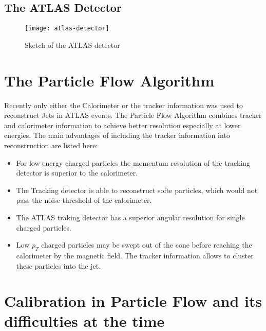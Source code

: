 \subsection{The ATLAS Detector}

\begin{figure}[htbp]
  \centering
  \texttt{[image: atlas-detector]}
  \caption[Sketch of the LHC ring, the position of the experiments and
  the surrounding countryside.]{Sketch of the ATLAS detector}
  \label{fig:atlas}
\end{figure}




\section{The Particle Flow Algorithm}

Recently only either the Calorimeter or the tracker information was used to reconstruct Jets in ATLAS events. The Particle Flow Algorithm combines tracker and calorimeter information to achieve better resolution especially at lower energies. The main advantages of including the tracker information into reconstruction are listed here:


\begin{itemize}
\item For low energy charged particles the momentum resolution of the tracking detector is superior to the calorimeter.
\item The Tracking detector is able to reconstruct softe particles, which would not pass the noise threshold of the calorimeter.
\item The ATLAS traking detector has a superior angular resolution for single charged particles.
\item Low $p_T$ charged particles may be swept out of the cone before reaching the calorimeter by the magnetic field. The tracker information allows to cluster these particles into the jet.
\end{itemize}


\section{Calibration in Particle Flow and its difficulties at the time}